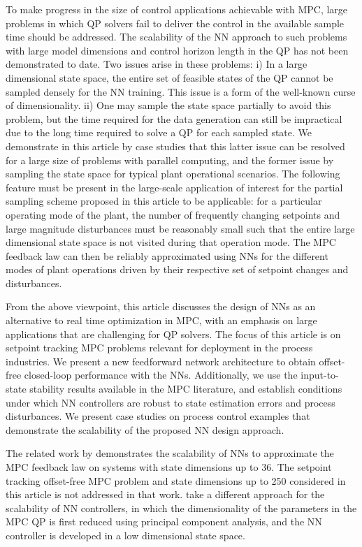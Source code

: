 \documentclass[preprint,5p, twocolumn, authoryear]{elsarticle}
\begin{document}
To make progress in the size of control applications achievable with MPC, large
problems in which QP solvers fail to deliver the control in the available sample
time should be addressed. The scalability of the NN approach to such problems
with large model dimensions and control horizon length in the QP has not been
demonstrated to date. Two issues arise in these problems: i) In a large
dimensional state space, the entire set of feasible states of the QP cannot be
sampled densely for the NN training. This issue is a form of the well-known
curse of dimensionality. ii) One may sample the state space partially to avoid
this problem, but the time required for the data generation can still be
impractical due to the long time required to solve a QP for each sampled state.
We demonstrate in this article by case studies that this latter issue can be
resolved for a large size of problems with parallel computing, and the former
issue by sampling the state space for typical plant operational scenarios. The
following feature must be present in the large-scale application of interest for
the partial sampling scheme proposed in this article to be applicable: for a
particular operating mode of the plant, the number of frequently changing
setpoints and large magnitude disturbances must be reasonably small such that
the entire large dimensional state space is not visited during that operation
mode. The MPC feedback law can then be reliably approximated using NNs for the
different modes of plant operations driven by their respective set of setpoint
changes and disturbances.

From the above viewpoint, this article discusses the design of NNs as an
alternative to real time optimization in MPC, with an emphasis on large
applications that are challenging for QP solvers. The focus of this article is
on setpoint tracking MPC problems relevant for deployment in the process
industries. We present a new feedforward network architecture to obtain
offset-free closed-loop performance with the NNs. Additionally, we use the
input-to-state stability results available in the MPC literature, and establish
conditions under which NN controllers are robust to state estimation errors
and process disturbances. We present case studies on process control examples
that demonstrate the scalability of the proposed NN design approach.

The related work by \cite*{chen:wang:atanasov:kumar:morari:2019} demonstrates
the scalability of NNs to approximate the MPC feedback law on systems with state
dimensions up to 36. The setpoint tracking offset-free MPC problem and state
dimensions up to 250 considered in this article is not addressed in that work. 
\cite*{drgona:picard:kvasnica:helsen:2018}
take a different approach for the scalability of NN controllers, in which the
dimensionality of the parameters in the MPC QP is first reduced using principal
component analysis, and the NN controller is developed in a low dimensional
state space.
\end{document}
